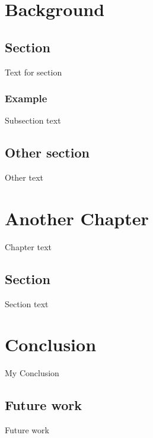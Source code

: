 \documentclass[12pt]{report}
\begin{document}
\chapter{Background}
\section{Section}
Text for section

\subsection*{Example}
Subsection text
\section{Other section}
Other text

\newpage
\chapter{Another Chapter}
Chapter text
\section{Section}
Section text


\chapter{Conclusion}
My Conclusion

\section*{Future work}
Future work
\newpage



\end{document}
